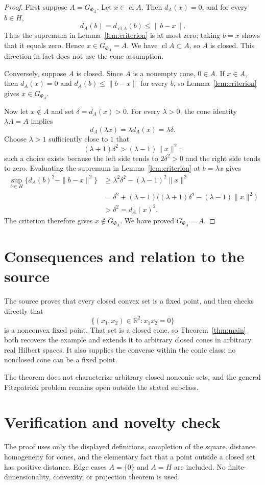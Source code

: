 \documentclass[11pt]{article}
\newcommand{\cl}{\operatorname{cl}}
\begin{document}
\begin{proof}
First suppose $A=G_{\Phi_A}$. Let $x\in\cl A$. Then $d_A(x)=0$, and for
every $b\in H$,
\[
 d_A(b)=d_{\cl A}(b)\leq\|b-x\|.
\]
Thus the supremum in Lemma~\ref{lem:criterion} is at most zero; taking
$b=x$ shows that it equals zero. Hence $x\in G_{\Phi_A}=A$. We have
$\cl A\subset A$, so $A$ is closed. This direction in fact does not use the
cone assumption.

Conversely, suppose $A$ is closed. Since $A$ is a nonempty cone, $0\in A$.
If $x\in A$, then $d_A(x)=0$ and
$d_A(b)\leq\|b-x\|$ for every $b$, so Lemma~\ref{lem:criterion} gives
$x\in G_{\Phi_A}$.

Now let $x\notin A$ and set $\delta=d_A(x)>0$. For every $\lambda>0$,
the cone identity $\lambda A=A$ implies
\[
 d_A(\lambda x)=\lambda d_A(x)=\lambda\delta.
\]
Choose $\lambda>1$ sufficiently close to $1$ that
\[
 (\lambda+1)\delta^2>(\lambda-1)\|x\|^2;
\]
such a choice exists because the left side tends to $2\delta^2>0$ and the
right side tends to zero. Evaluating the supremum in
Lemma~\ref{lem:criterion} at $b=\lambda x$ gives
\begin{align*}
 \sup_{b\in H}\{d_A(b)^2-\|b-x\|^2\}
 &\geq \lambda^2\delta^2-(\lambda-1)^2\|x\|^2\\
 &=\delta^2+(\lambda-1)
   \bigl((\lambda+1)\delta^2-(\lambda-1)\|x\|^2\bigr)\\
 &>\delta^2=d_A(x)^2.
\end{align*}
The criterion therefore gives $x\notin G_{\Phi_A}$. We have proved
$G_{\Phi_A}=A$.
\end{proof}

\section{Consequences and relation to the source}
The source proves that every closed convex set is a fixed point, and then
checks directly that
\[
 \{(x_1,x_2)\in\mathbb R^2:x_1x_2=0\}
\]
is a nonconvex fixed point. That set is a closed cone, so
Theorem~\ref{thm:main} both recovers the example and extends it to arbitrary
closed cones in arbitrary real Hilbert spaces. It also supplies the converse
within the conic class: no nonclosed cone can be a fixed point.

The theorem does not characterize arbitrary closed nonconic sets, and the
general Fitzpatrick problem remains open outside the stated subclass.

\section{Verification and novelty check}
The proof uses only the displayed definitions, completion of the square,
distance homogeneity for cones, and the elementary fact that a point outside
a closed set has positive distance. Edge cases $A=\{0\}$ and $A=H$ are
included. No finite-dimensionality, convexity, or projection theorem is used.
\end{document}
